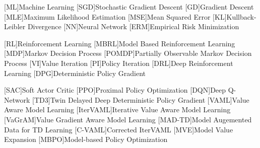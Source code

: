 [ML]{Machine Learning}
[SGD]{Stochastic Gradient Descent}
[GD]{Gradient Descent}
[MLE]{Maximum Likelihood Estimation}
[MSE]{Mean Squared Error}
[KL]{Kullback-Leibler Divergence}
[NN]{Neural Network}
[ERM]{Empirical Risk Minimization}

[RL]{Reinforcement Learning}
[MBRL]{Model Based Reinforcement Learning}
[MDP]{Markov Decision Process}
[POMDP]{Partially Observable Markov Decision Process}
[VI]{Value Iteration}
[PI]{Policy Iteration}
[DRL]{Deep Reinforcement Learning}
[DPG]{Deterministic Policy Gradient}

[SAC]{Soft Actor Critic}
[PPO]{Proximal Policy Optimization}
[DQN]{Deep Q-Network}
[TD3]{Twin Delayed Deep Deterministic Policy Gradient}
[VAML]{Value Aware Model Learning}
[IterVAML]{Iterative Value Aware Model Learning}
[VaGrAM]{Value Gradient Aware Model Learning}
[MAD-TD]{Model Augemented Data for TD Learning}
[C-VAML]{Corrected IterVAML}
[MVE]{Model Value Expansion}
[MBPO]{Model-based Policy Optimization}
